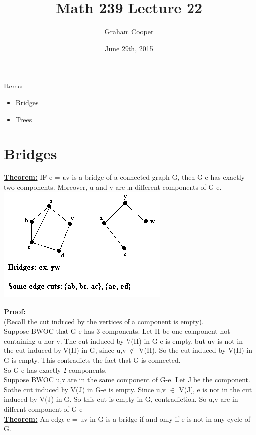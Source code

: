 \documentclass[12pt]{article}
\title{\vspace{-15ex}Math 239 Lecture 22\vspace{-1ex}}
\date{June 29th, 2015}
\author{Graham Cooper}
\newcommand{\myt}[1]{\textbf{\underline{#1}}}
\begin{document}
	\maketitle
	
	Items:\\
	\begin{itemize}
		\item Bridges
		\item Trees
	\end{itemize}
	
	\section*{Bridges}
	
	\myt{Theorem:} IF e = uv is a bridge of a connected graph G, then G-e has exactly two components. Moreover, u and v are in different components of G-e.\\
	\includegraphics[scale=0.5]{bridge.png}
	
	\myt{Proof:}\\
	(Recall the cut induced by the vertices of a component is empty).\\
	Suppose BWOC that G-e has 3 components. Let H be one component not containing u nor v. The cut induced by V(H) in G-e is empty, but uv is not in the cut induced by V(H) in G, since u,v $\notin$ V(H). So the cut induced by V(H) in G is empty. This contradicts the fact that G is connected.\\
	So G-e has exactly 2 components.\\
	
	Suppose BWOC u,v are in the same component of G-e. Let J be the component. Sothe cut induced by V(J) in G-e is empty. Since u,v $\in$ V(J), e is not in the cut induced by V(J) in G. So this cut is empty in G, contradiction. So u,v are in differnt component of G-e\\
	
	\myt{Theorem:} An edge e = uv in G is a bridge if and only if e is not in any cycle of G.\\
	
\end{document}
